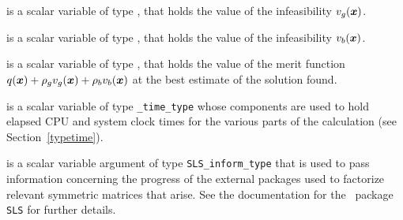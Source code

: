 \begin{description}
 is a scalar variable of type \realdp, that holds the
value of the infeasibility $v_g({\bm{x}})$.

 is a scalar variable of type \realdp, that holds the
value of the infeasibility $v_b({\bm{x}})$.

 is a scalar variable of type \realdp, that holds the
value of the merit function $q({\bm{x}}) + \rho_g v_g({\bm{x}}) + \rho_b v_b({\bm{x}})$ 
at the best estimate of the solution found.

 is a scalar variable of type {\tt \packagename\_time\_type} 
whose components are used to hold elapsed CPU  and system clock 
times for the various parts of the calculation (see Section~\ref{typetime}).

 is a scalar variable argument of type 
{\tt SLS\_inform\_type} that is used to pass information
concerning the progress of the external packages used to 
factorize relevant symmetric matrices that arise. 
See the documentation for the \galahad\ package {\tt SLS} for further details. 

\end{description}
